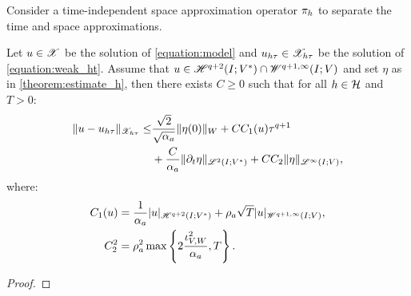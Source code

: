 Consider a time-independent space approximation operator $\pi_h$ to separate the time and space approximations.

\begin{theorem} \label{theorem:estimate_ht}
    Let $u \in \mathscr{X}$ be the solution of \cref{equation:model} and $u_{h \tau} \in \mathscr{X}_{h \tau}$ be the solution of \cref{equation:weak_ht}. Assume that $u \in \mathscr{H}^{q + 2}(I; V^*) \cap \mathscr{W}^{q + 1, \infty}(I; V)$ and set $\eta$ as in \cref{theorem:estimate_h}, then there exists $C \geq 0$ such that for all $h \in \mathcal{H}$ and $T > 0$:
    \begin{align}
        \lVert u - u_{h \tau} \rVert_{\mathscr{X}_{h \tau}} \leq & \frac{\sqrt{2}}{\sqrt{\alpha_{a}}} \lVert \eta(0) \rVert_W + C C_1(u) \tau^{q + 1} \\
        & + \frac{C}{\alpha_{a}} \lVert \partial_t \eta \rVert_{\mathscr{L}^{2}(I; V^*)} + C C_2 \lVert \eta \rVert_{\mathscr{L}^{\infty}(I; V)}, \notag
    \end{align}
    where:
    \begin{align}
        C_1(u) & = \frac{1}{\alpha_{a}} \lvert u \rvert_{\mathscr{H}^{q + 2}(I; V^*)} + \rho_{a} \sqrt{T} \lvert u \rvert_{\mathscr{W}^{q + 1, \infty}(I; V)}, \\
        C_2^2 & = \rho_{a}^2 \max \left\{ 2 \frac{\iota_{V, W}^2}{\alpha_{a}}, T \right\}.
    \end{align}
\end{theorem}

\begin{proof}
        
\end{proof}